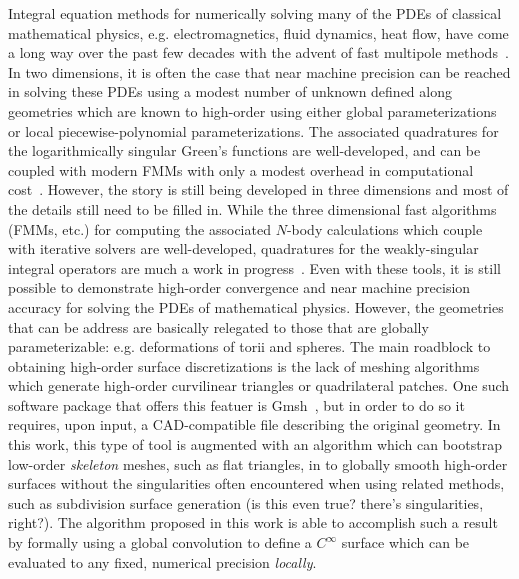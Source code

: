 \documentclass[11pt]{article}
\numberwithin{equation}{section}
\begin{document}
Integral equation methods for numerically solving many of the PDEs of
classical mathematical physics, e.g. electromagnetics, fluid dynamics,
heat flow, have come a long way over the past few decades with the
advent of fast multipole methods~\cite{}. In two dimensions, it is
often the case that near machine precision can be reached in solving
these PDEs using a modest number of unknown defined along geometries
which are known to high-order using either global parameterizations or
local piecewise-polynomial parameterizations. The associated
quadratures for the logarithmically singular Green's functions are
well-developed, and can be coupled with modern FMMs with only a modest
overhead in computational cost~\cite{qbxfmm,etc}. However, the story
is still being developed in three dimensions and most of the details
still need to be filled in.  While the three dimensional fast
algorithms (FMMs, etc.) for computing the associated $N$-body
calculations which couple with iterative solvers are well-developed,
quadratures for the weakly-singular integral operators are much a work
in progress~\cite{qbx3d,bremer,bruno}.  Even with these tools, it is
still possible to demonstrate high-order convergence and near machine
precision accuracy for solving the PDEs of mathematical
physics. However, the geometries that can be address are basically
relegated to those that are globally parameterizable:
e.g. deformations of torii and spheres.  The main roadblock to
obtaining high-order surface discretizations is the lack of meshing
algorithms which generate high-order curvilinear triangles or
quadrilateral patches.  One such software package that offers this
featuer is Gmsh~\cite{gmsh}, but in order to do so it requires, upon
input, a CAD-compatible file describing the original geometry.  In
this work, this type of tool is augmented with an algorithm which
can bootstrap low-order \emph{skeleton} meshes, such as flat
triangles, in to globally smooth high-order surfaces without the
singularities often encountered when using related methods, such as
subdivision surface generation (is this even true? there's
singularities, right?). The algorithm proposed in this work is able to
accomplish such a result by formally using a global convolution to
define a $C^\infty$ surface which can be evaluated to any fixed,
numerical precision \emph{locally}.
\end{document}
